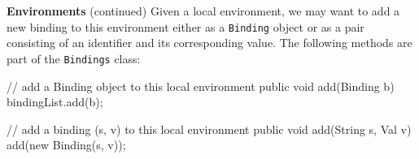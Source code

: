 \begin{minipage}[t]{\sw}
\slidenumber
\LARGE
{\bf Environments} (continued)\exx
Given a local environment,
we may want to add a new binding to this environment
either as a \verb'Binding' object
or as a pair consisting of an identifier and its corresponding value.
The following methods are part of the \verb'Bindings' class:
\begin{qv}
    // add a Binding object to this local environment
    public void add(Binding b) {
        bindingList.add(b);
    }

    // add a binding (s, v) to this local environment
    public void add(String s, Val v) {
        add(new Binding(s, v));
    }
\end{qv}
\end{minipage}
